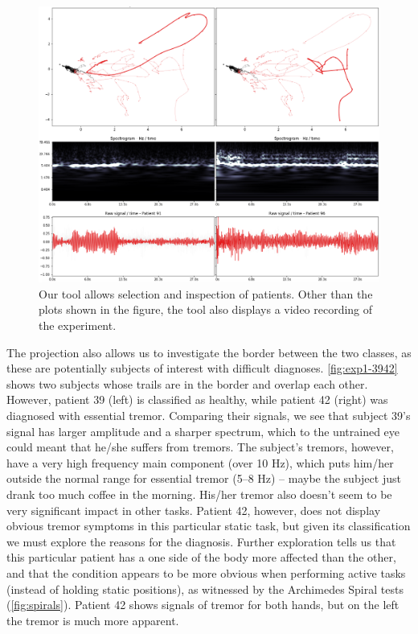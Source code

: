 \begin{figure}[ht]
\centering
\includegraphics[width=\linewidth]{figures/nemo/exp1-9196.png}
\caption{Our tool allows selection and inspection of patients. Other than the plots shown in the figure, the tool also displays a video recording of the experiment. }
\label{fig:exp1-9196}
\end{figure}

The projection also allows us to investigate the border between the two classes, as these are potentially subjects of interest with difficult diagnoses.
\cref{fig:exp1-3942} shows two subjects whose trails are in the border and overlap each other. However, patient 39 (left) is classified as healthy, while patient 42 (right) was diagnosed with essential tremor. Comparing their signals, we see that subject 39's signal has larger amplitude and a sharper spectrum, which to the untrained eye could meant that he/she suffers from tremors. The subject's tremors, however, have a very high frequency main component (over 10 Hz), which puts him/her outside the normal range for essential tremor (5--8 Hz) -- maybe the subject just drank too much coffee in the morning. His/her tremor also doesn't seem to be very significant impact in other tasks. Patient 42, however, does not display obvious tremor symptoms in this particular static task, but given its classification we must explore the reasons for the diagnosis. Further exploration tells us that this particular patient has a one side of the body more affected than the other, and that the condition appears to be more obvious when performing active tasks (instead of holding static positions), as witnessed by the Archimedes Spiral tests (\cref{fig:spirals}). Patient 42 shows signals of tremor for both hands, but on the left the tremor is much more apparent.

